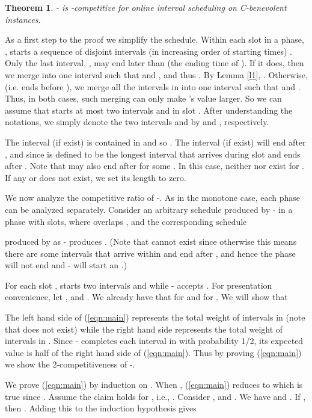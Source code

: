 \documentclass[11pt]{article}
\newtheorem{theorem}{Theorem}[section]
\newcommand{\qed}{\hspace*{\fill}\par\medskip}
\newenvironment{proof}{\noindent{\it Proof. }\ignorespaces}{\qed}
\begin{document}
\begin{theorem} 
- is -competitive for online interval scheduling on 
C-benevolent instances.
\end{theorem}
\begin{proof}
As a first step to the proof we simplify the  schedule.
Within each slot  in a phase, ,
 starts a sequence of disjoint intervals 
(in increasing order of starting times)
.
Only the last interval, , may end later than
 (the ending time of ). 
If it does, then we merge  into 
one interval  such that  and 
, and thus
.  
By Lemma \ref{l1}, . 
Otherwise, (i.e.  ends before ), we merge all 
the intervals in  into one interval  such that
 and
.  
Thus, in both cases, such merging can only make 's value larger.  
So we can assume that  starts at most two intervals  and
 in slot .
After understanding the notations, we simply denote
the two intervals  and  by  and
, respectively. 

The interval  (if exist) is contained in  and so
.
The interval  (if exist) will end after ,
and  
since  is defined to be the longest interval that arrives
during slot  and ends after .
Note that  may also end after  for some . 
In this case, neither  nor  exist 
for . 
If any  or  does not exist,
we set its length to zero. 


We now analyze the competitive ratio of -.
As in the monotone case, each phase can be analyzed separately.
Consider an arbitrary schedule
 produced by - in a phase
with  slots, where  overlaps  , 
and the corresponding schedule

produced by  as - produces .
(Note that 
 cannot
exist since otherwise this means there are some intervals that arrive 
within  and end after , and hence 
the phase will not end and - will start an .)

For each slot ,  starts two intervals  and
 while - accepts . 
For presentation convenience,
let , 
and . 
We already have that
 for  
and  for .
We will show that 


The left hand side of (\ref{eqn:main}) represents the total weight of 
intervals in  (note that  does not exist)
while the right hand side represents the total weight of intervals in
. 
Since - completes each interval in  with probability 1/2,
its expected value is half of the right hand side of (\ref{eqn:main}).
Thus by proving (\ref{eqn:main}) we show the 2-competitiveness
of -.

We prove (\ref{eqn:main}) by induction on .
When , (\ref{eqn:main}) reduces to  
which is true since .
Assume the claim holds for , i.e.,
.
Consider ,  and .
We have  and .
If , then 
.
Adding this to the induction hypothesis gives


\end{proof}
\end{document}
